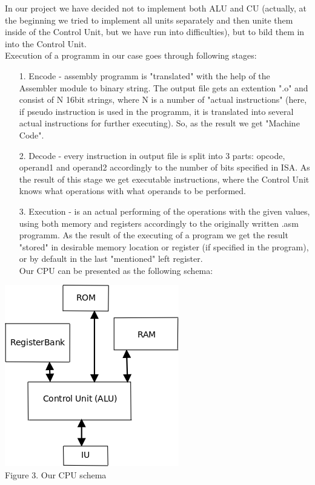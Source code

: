 \documentclass[11pt,a4paper]{article}
\begin{document}
In our project we have decided not to implement both ALU and CU (actually, at the beginning we tried to implement all units separately and then unite them inside of the Control Unit, but we have run into difficulties), but to bild them in into the Control Unit.\\
Execution of a programm in our case goes through following stages:
\begin{enumerate}
	\item[1.] Encode - assembly programm is "translated" with the help of the Assembler module to binary string. The output file gets an extention ".o" and consist of N 16bit strings, where N is a number of "actual instructions" (here, if pseudo instruction is used in the programm, it is translated into several actual instructions for further executing). So, as the result we get "Machine Code".
	\item[2.] Decode - every instruction in output file is split into 3 parts: opcode, operand1 and operand2 accordingly to the number of bits specified in ISA. As the result of this stage we get executable instructions, where the Control Unit knows what operations with what operands to be performed. 
	\item[3.] Execution - is an actual performing of the operations with the given values, using both memory and registers accordingly to the originally written .asm programm. As the result of the executing of a program we get the result "stored" in desirable memory location or register (if specified in the program), or by default in the last "mentioned" left register.\\
Our CPU can be presented as the following schema:
\end{enumerate} 
\begin{center}
\includegraphics[scale=0.6]{pics/ourCPU.png}\\
Figure 3. Our CPU schema
\end{center}
\end{document}
